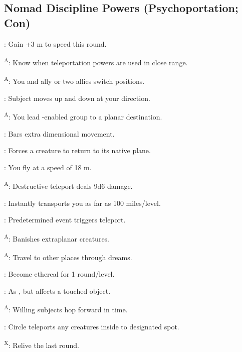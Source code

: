 \subsection{Nomad Discipline Powers {\normalsize(Psychoportation; Con)}}
\begin{enumerate*}
\item {}: Gain +3 m to speed this round.

\textsuperscript{A}: Know when teleportation powers are used in close range.

\item {}\textsuperscript{A}: You and ally or two allies switch positions.

: Subject moves up and down at your direction.

\item {}\textsuperscript{A}: You lead -enabled group to a planar destination.
\item {}: Bars extra dimensional movement.

: Forces a creature to return to its native plane.

: You fly at a speed of 18 m.

\item {}\textsuperscript{A}: Destructive teleport deals 9d6 damage.

: Instantly transports you as far as 100 miles/level.

: Predetermined event triggers teleport.

\item {}\textsuperscript{A}: Banishes extraplanar creatures.
\item {}\textsuperscript{A}: Travel to other places through dreams.

: Become ethereal for 1 round/level.

: As , but affects a touched object. %

\item {}\textsuperscript{A}: Willing subjects hop forward in time.
\item {}: Circle teleports any creatures inside to designated spot.

\textsuperscript{X}: Relive the last round.
\end{enumerate*}



